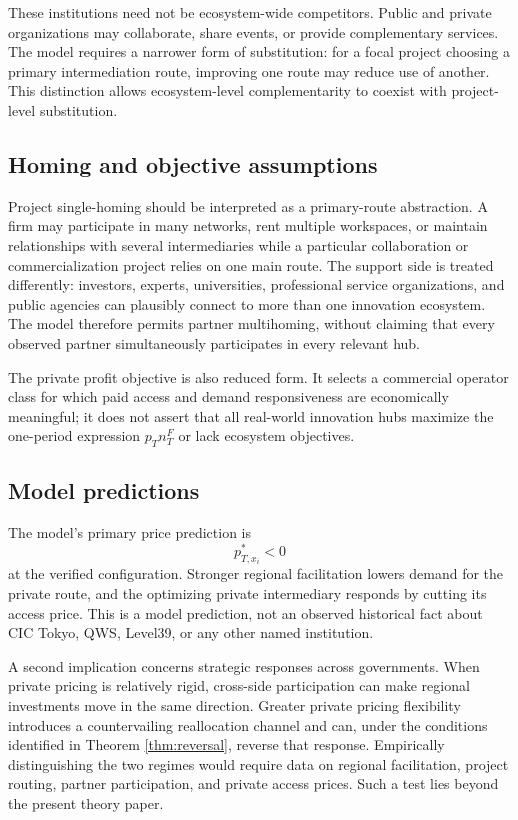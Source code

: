 These institutions need not be ecosystem-wide competitors. Public and private organizations may collaborate, share events, or provide complementary services. The model requires a narrower form of substitution: for a focal project choosing a primary intermediation route, improving one route may reduce use of another. This distinction allows ecosystem-level complementarity to coexist with project-level substitution.

\subsection{Homing and objective assumptions}

Project single-homing should be interpreted as a primary-route abstraction. A firm may participate in many networks, rent multiple workspaces, or maintain relationships with several intermediaries while a particular collaboration or commercialization project relies on one main route. The support side is treated differently: investors, experts, universities, professional service organizations, and public agencies can plausibly connect to more than one innovation ecosystem. The model therefore permits partner multihoming, without claiming that every observed partner simultaneously participates in every relevant hub.

The private profit objective is also reduced form. It selects a commercial operator class for which paid access and demand responsiveness are economically meaningful; it does not assert that all real-world innovation hubs maximize the one-period expression $p_Tn_T^F$ or lack ecosystem objectives.

\subsection{Model predictions}

The model's primary price prediction is
\[
p^*_{T,x_i}<0
\]
at the verified configuration. Stronger regional facilitation lowers demand for the private route, and the optimizing private intermediary responds by cutting its access price. This is a model prediction, not an observed historical fact about CIC Tokyo, QWS, Level39, or any other named institution.

A second implication concerns strategic responses across governments. When private pricing is relatively rigid, cross-side participation can make regional investments move in the same direction. Greater private pricing flexibility introduces a countervailing reallocation channel and can, under the conditions identified in Theorem \ref{thm:reversal}, reverse that response. Empirically distinguishing the two regimes would require data on regional facilitation, project routing, partner participation, and private access prices. Such a test lies beyond the present theory paper.
